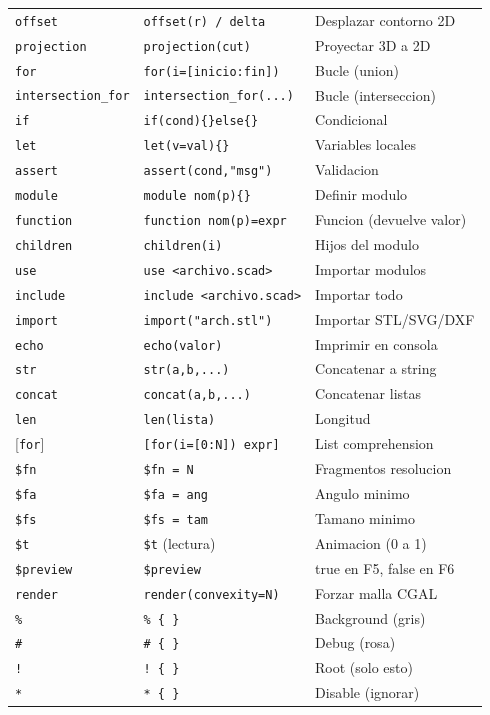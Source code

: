 \documentclass[12pt, oneside, a4paper]{report}
\newcommand{\codigo}[1]{\texttt{#1}}
\begin{document}
\begin{center}
\begin{longtable}{lll}
\codigo{offset} & \codigo{offset(r) / delta} & Desplazar contorno 2D \\
\codigo{projection} & \codigo{projection(cut)} & Proyectar 3D a 2D \\
\codigo{for} & \codigo{for(i=[inicio:fin])} & Bucle (union) \\
\codigo{intersection\_for} & \codigo{intersection\_for(...)} & Bucle (interseccion) \\
\codigo{if} & \codigo{if(cond)\{\}else\{\}} & Condicional \\
\codigo{let} & \codigo{let(v=val)\{\}} & Variables locales \\
\codigo{assert} & \codigo{assert(cond,"msg")} & Validacion \\
\codigo{module} & \codigo{module nom(p)\{\}} & Definir modulo \\
\codigo{function} & \codigo{function nom(p)=expr} & Funcion (devuelve valor) \\
\codigo{children} & \codigo{children(i)} & Hijos del modulo \\
\codigo{use} & \codigo{use <archivo.scad>} & Importar modulos \\
\codigo{include} & \codigo{include <archivo.scad>} & Importar todo \\
\codigo{import} & \codigo{import("arch.stl")} & Importar STL/SVG/DXF \\
\codigo{echo} & \codigo{echo(valor)} & Imprimir en consola \\
\codigo{str} & \codigo{str(a,b,...)} & Concatenar a string \\
\codigo{concat} & \codigo{concat(a,b,...)} & Concatenar listas \\
\codigo{len} & \codigo{len(lista)} & Longitud \\
{[}\codigo{for}{]} & \codigo{[for(i=[0:N]) expr]} & List comprehension \\
\codigo{\$fn} & \codigo{\$fn = N} & Fragmentos resolucion \\
\codigo{\$fa} & \codigo{\$fa = ang} & Angulo minimo \\
\codigo{\$fs} & \codigo{\$fs = tam} & Tamano minimo \\
\codigo{\$t} & \codigo{\$t} (lectura) & Animacion (0 a 1) \\
\codigo{\$preview} & \codigo{\$preview} & true en F5, false en F6 \\
\codigo{render} & \codigo{render(convexity=N)} & Forzar malla CGAL \\
\codigo{\%} & \codigo{\% \{ \}} & Background (gris) \\
\codigo{\#} & \codigo{\# \{ \}} & Debug (rosa) \\
\codigo{!} & \codigo{! \{ \}} & Root (solo esto) \\
\codigo{*} & \codigo{* \{ \}} & Disable (ignorar) \\
\end{longtable}
\end{center}
\end{document}
